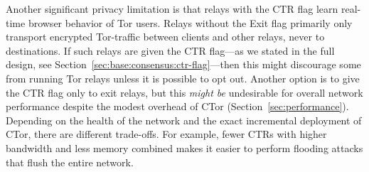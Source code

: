 Another significant privacy limitation is that relays with the CTR flag learn
real-time browser behavior of Tor users. Relays without the Exit flag primarily
only transport encrypted Tor-traffic between clients and other relays, never to
destinations. If such relays are given the CTR flag---as we stated in the full
design, see Section~\ref{sec:base:consensus:ctr-flag}---then this might
discourage some from running Tor relays unless it is possible to opt out.
Another option is to give the CTR flag only to exit relays, but this \emph{might
be} undesirable for overall network performance despite the modest overhead of
CTor (Section~\ref{sec:performance}). Depending on the health of the network and
the exact incremental deployment of CTor, there are different trade-offs. For
example, fewer CTRs with higher bandwidth and less memory combined makes it
easier to perform flooding attacks that flush the entire network.
